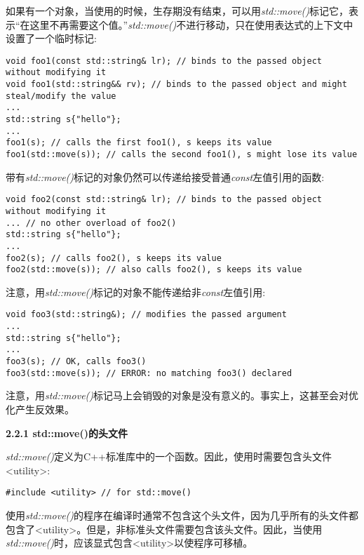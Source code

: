 如果有一个对象，当使用的时候，生存期没有结束，可以用\textit{std::move()}标记它，表示“在这里不再需要这个值。”\textit{std::move()}不进行移动，只在使用表达式的上下文中设置了一个临时标记:\par

\begin{lstlisting}[caption={}]
void foo1(const std::string& lr); // binds to the passed object without modifying it
void foo1(std::string&& rv); // binds to the passed object and might steal/modify the value
...
std::string s{"hello"};
...
foo1(s); // calls the first foo1(), s keeps its value
foo1(std::move(s)); // calls the second foo1(), s might lose its value
\end{lstlisting}

带有\textit{std::move()}标记的对象仍然可以传递给接受普通\textit{const}左值引用的函数:\par

\begin{lstlisting}[caption={}]
void foo2(const std::string& lr); // binds to the passed object without modifying it
... // no other overload of foo2()
std::string s{"hello"};
...
foo2(s); // calls foo2(), s keeps its value
foo2(std::move(s)); // also calls foo2(), s keeps its value
\end{lstlisting}

注意，用\textit{std::move()}标记的对象不能传递给非\textit{const}左值引用:\par

\begin{lstlisting}[caption={}]
void foo3(std::string&); // modifies the passed argument
...
std::string s{"hello"};
...
foo3(s); // OK, calls foo3()
foo3(std::move(s)); // ERROR: no matching foo3() declared
\end{lstlisting}

注意，用\textit{std::move()}标记马上会销毁的对象是没有意义的。事实上，这甚至会对优化产生反效果。

\hspace*{\fill} \par %
\textbf{2.2.1 std::move()的头文件}

\textit{std::move()}定义为C++标准库中的一个函数。因此，使用时需要包含头文件<utility>:\par

\begin{lstlisting}[caption={}]
#include <utility> // for std::move()
\end{lstlisting}

使用\textit{std::move()}的程序在编译时通常不包含这个头文件，因为几乎所有的头文件都包含了<utility>。但是，非标准头文件需要包含该头文件。因此，当使用\textit{std::move()}时，应该显式包含<utility>以使程序可移植。\par

